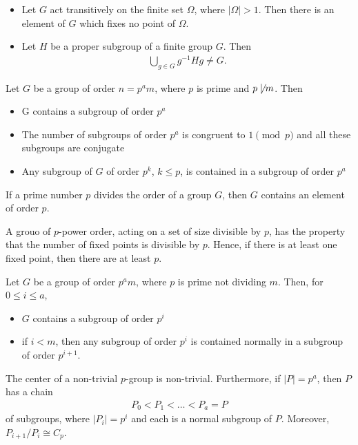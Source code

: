 \documentclass{memoir}
\begin{document}
\begin{cor}
\begin{itemize}
	\item Let \(G\) act transitively on the finite set \(\Omega\), where \(\left| \Omega \right| >1\). Then there is an element of \(G\) which fixes no point of \(\Omega\).
	\item Let \(H\) be a proper subgroup of a finite group \(G\). Then
		\begin{align*}
			\bigcup_{g \in G} g^{-1}Hg \neq G.
		\end{align*}
\end{itemize}
\end{cor}

\begin{thm}
	Let \(G\) be a group of order \(n = p^{a}m\), where \(p\) is prime and \(p \not\mid m\). Then
	\begin{itemize}
		\item G contains a subgroup of order \(p^{a}\) 
		\item The number of subgroups of order \(p^{a}\) is congruent to \(1 \pmod p\) and all these subgroups are conjugate
		\item Any subgroup of \(G\) of order \(p^{k}\), \(k\leq p\), is contained in a subgroup of order \(p^{a}\)
	\end{itemize}
\end{thm}

\begin{thm}
	If a prime number \(p\) divides the order of a group \(G\), then \(G\) contains an element of order \(p\).
\end{thm}
A grouo of \(p\)-power order, acting on a set of size divisible by \(p\), has the property that the number of fixed points is divisible by \(p\). Hence, if there is at least one fixed point, then there are at least \(p\).

\begin{thm}
	Let \(G\) be a group of order \(p^{a}m\), where \(p\) is prime not dividing \(m\). Then, for \(0\leq i\leq a\),
	\begin{itemize}
		\item \(G\) contains a subgroup of order \(p^{i}\) 
		\item if \(i<m\), then any subgroup of order \(p^{i}\) is contained normally in a subgroup of order \(p^{i+1}\).
	\end{itemize}
\end{thm}

\begin{thm}
	The center of a non-trivial \(p\)-group is non-trivial. Furthermore, if \(\left| P \right| = p^{a}\), then \(P\) has a chain
	\begin{align*}
		P_0<P_1<\ldots<P_a=P
	\end{align*}
	of subgroups, where \(\left| P_i \right| =p^{i}\) and each is a normal subgroup of \(P\). Moreover, \(P_{i+1} / P_i \cong C_p\).
\end{thm}
\end{document}
